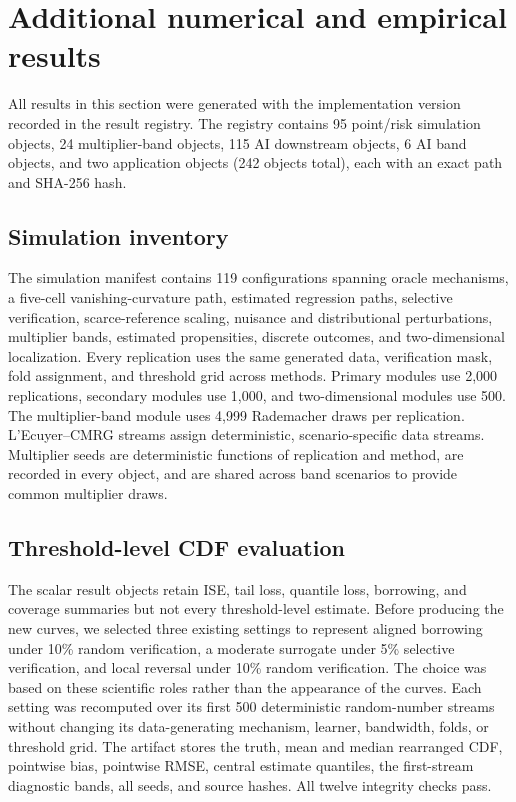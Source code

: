 \section{Additional numerical and empirical results}
\label{sec:supp-numerics}

All results in this section were generated with the implementation version
recorded in the result registry. The registry contains 95 point/risk
simulation objects, 24 multiplier-band objects, 115 AI downstream objects, 6 AI
band objects, and two application objects (242 objects total), each with an exact
path and SHA-256 hash.

\subsection{Simulation inventory}

The simulation manifest contains 119 configurations spanning oracle
mechanisms, a five-cell vanishing-curvature path, estimated regression paths,
selective verification, scarce-reference scaling, nuisance and distributional
perturbations, multiplier bands, estimated propensities, discrete outcomes,
and two-dimensional localization. Every replication uses the same generated
data, verification mask, fold assignment, and threshold grid across methods.
Primary modules use 2,000 replications, secondary modules use 1,000, and
two-dimensional modules use 500. The multiplier-band module uses 4,999
Rademacher draws per replication. L'Ecuyer--CMRG streams assign deterministic,
scenario-specific data streams. Multiplier seeds are deterministic functions
of replication and method, are recorded in every object, and are shared across
band scenarios to provide common multiplier draws.

\subsection{Threshold-level CDF evaluation}

The scalar result objects retain ISE, tail loss, quantile loss, borrowing,
and coverage summaries but not every threshold-level estimate. Before producing
the new curves, we selected three existing settings to represent aligned
borrowing under 10\% random verification, a moderate surrogate under 5\%
selective verification, and local reversal under 10\% random verification.
The choice was based on these scientific roles rather than the appearance of
the curves. Each setting was recomputed over its first 500 deterministic
random-number streams without changing its data-generating
mechanism, learner, bandwidth, folds, or threshold grid. The artifact stores
the truth, mean and median rearranged CDF, pointwise bias, pointwise RMSE,
central estimate quantiles, the first-stream diagnostic bands, all seeds, and
source hashes. All twelve integrity checks pass.

